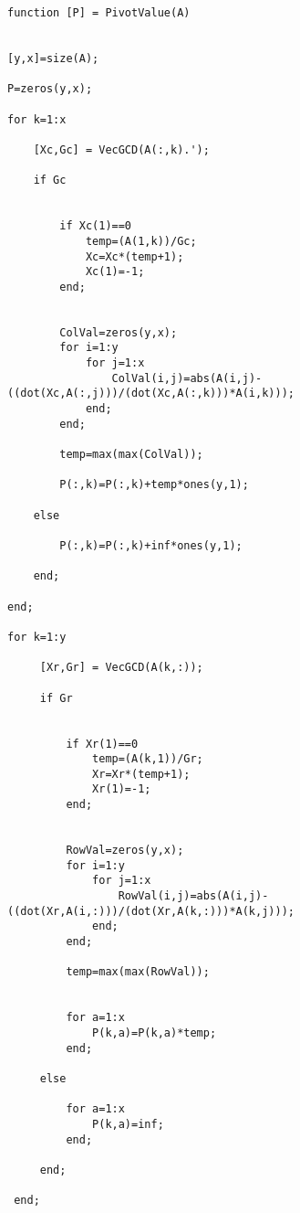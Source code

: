 \documentclass{article}
\theoremstyle{plain}
\theoremstyle{definition}
\numberwithin{thm}{section}
\begin{document}
				\begin{lstlisting}[frame=single]
function [P] = PivotValue(A)
 
 
[y,x]=size(A);
 
P=zeros(y,x);
 
for k=1:x
    
    [Xc,Gc] = VecGCD(A(:,k).');
 
    if Gc
    
        
        if Xc(1)==0
            temp=(A(1,k))/Gc;
            Xc=Xc*(temp+1);
            Xc(1)=-1;
        end;
 
         
        ColVal=zeros(y,x);
        for i=1:y
            for j=1:x
                ColVal(i,j)=abs(A(i,j)-((dot(Xc,A(:,j)))/(dot(Xc,A(:,k)))*A(i,k)));
            end;
        end;
 
        temp=max(max(ColVal));
 
        P(:,k)=P(:,k)+temp*ones(y,1);
    
    else
    
        P(:,k)=P(:,k)+inf*ones(y,1);
        
    end;
    
end;
 
for k=1:y
     
     [Xr,Gr] = VecGCD(A(k,:));
 
     if Gr
        
         
         if Xr(1)==0
             temp=(A(k,1))/Gr;
             Xr=Xr*(temp+1);
             Xr(1)=-1;
         end;
        
         
         RowVal=zeros(y,x);
         for i=1:y
             for j=1:x
                 RowVal(i,j)=abs(A(i,j)-((dot(Xr,A(i,:)))/(dot(Xr,A(k,:)))*A(k,j)));
             end;
         end;
 
         temp=max(max(RowVal));
 
         
         for a=1:x
             P(k,a)=P(k,a)*temp;
         end;
     
     else
     
         for a=1:x
             P(k,a)=inf;
         end;
         
     end;
         
 end;

				\end{lstlisting}
				
\end{document}
